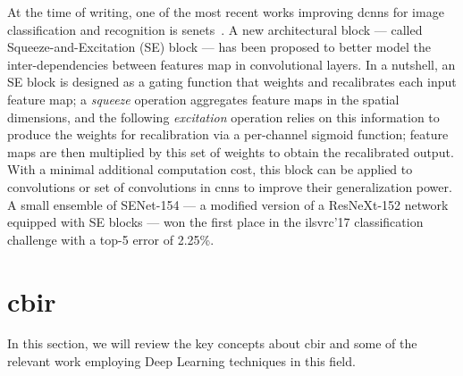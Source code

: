 At the time of writing, one of the most recent works improving \glspl{dcnn} for image classification and recognition is \glspl{senet}~\cite{hu2017squeeze}.
A new architectural block --- called Squeeze-and-Excitation (SE) block --- has been proposed to better model the inter-dependencies between features map in convolutional layers.
In a nutshell, an SE block is designed as a gating function that weights and recalibrates each input feature map;
a \emph{squeeze} operation aggregates feature maps in the spatial dimensions, and the following \emph{excitation} operation relies on this information to produce the weights for recalibration via a per-channel sigmoid function;
feature maps are then multiplied by this set of weights to obtain the recalibrated output.
With a minimal additional computation cost, this block can be applied to convolutions or set of convolutions in \glspl{cnn} to improve their generalization power.
A small ensemble of SENet-154 --- a modified version of a ResNeXt-152 network~\cite{xie2017aggregated} equipped with SE blocks --- won the first place in the \gls{ilsvrc}'17 classification challenge with a top-5 error of 2.25\%.




\section{\acrlong{cbir}}
\label{sec:back:image-retrieval}
In this section, we will review the key concepts about \acrlong{cbir} and some of the relevant work employing Deep Learning techniques in this field.

